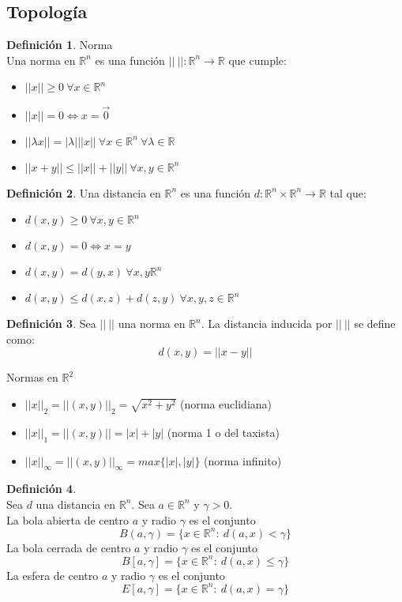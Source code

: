 \documentclass[10pt]{article}
\theoremstyle{definition}
\newtheorem{definition}{Definición}[section]
\begin{document}
\subsection{Topología}
\begin{definition}{Norma}
	\\Una norma en $\mathbb{R}^n$ es una función $||\ ||:\mathbb{R}^n\to\mathbb{R}$ que cumple:
	\begin{itemize}
		\item $||x||\ge 0\ \forall x\in\mathbb{R}^n$
		\item $||x||=0\Leftrightarrow x=\vec{0}$
		\item $||\lambda x||=|\lambda|||x||\ \forall x\in\mathbb{R}^n\ \forall\lambda\in\mathbb{R}$
		\item $||x+y||\le ||x||+||y||\ \forall x,y\in\mathbb{R}^n$
	\end{itemize}
\end{definition}
\begin{definition}
	Una distancia en $\mathbb{R}^n$ es una función $d:\mathbb{R}^n\times\mathbb{R}^n\to\mathbb{R}$ tal que:
	\begin{itemize}
		\item $d(x,y)\ge 0\ \forall x,y\in\mathbb{R}^n$
		\item $d(x,y)=0\Leftrightarrow x=y$
		\item $d(x,y)=d(y,x)\ \forall x,y\mathbb{R}^n$
		\item $d(x,y)\le d(x,z)+d(z,y)\ \forall x,y,z\in\mathbb{R}^n$
	\end{itemize}
\end{definition}
\begin{definition}
	Sea $||\ ||$ una norma en $\mathbb{R}^n$. La distancia inducida por $||\ ||$ se define como: $$d(x,y)=||x-y||$$
\end{definition}
Normas en $\mathbb{R}^2$
\begin{itemize}
	\item $||x||_2=||(x,y)||_2=\sqrt{x^2+y^2}$ (norma euclidiana)
	\item $||x||_1=||(x,y)||=|x|+|y|$ (norma 1 o del taxista)
	\item $||x||_{\infty}=||(x,y)||_{\infty}=max\{|x|,|y|\}$ (norma infinito)
\end{itemize}
\begin{definition}{ \ }
	\\Sea $d$ una distancia en $\mathbb{R}^n$. Sea $a\in\mathbb{R}^n$ y $\gamma >0$.
	\\La bola abierta de centro $a$ y radio $\gamma$ es el conjunto $$B(a,\gamma)=\{x\in\mathbb{R}^n :\ d(a,x)<\gamma \}$$
	La bola cerrada de centro $a$ y radio $\gamma$ es el conjunto $$B[a,\gamma]=\{x\in\mathbb{R}^n :\ d(a,x)\le\gamma \}$$
	La esfera de centro $a$ y radio $\gamma$ es el conjunto $$E[a,\gamma]=\{x\in\mathbb{R}^n:\ d(a,x)=\gamma \}$$
\end{definition}
\end{document}
